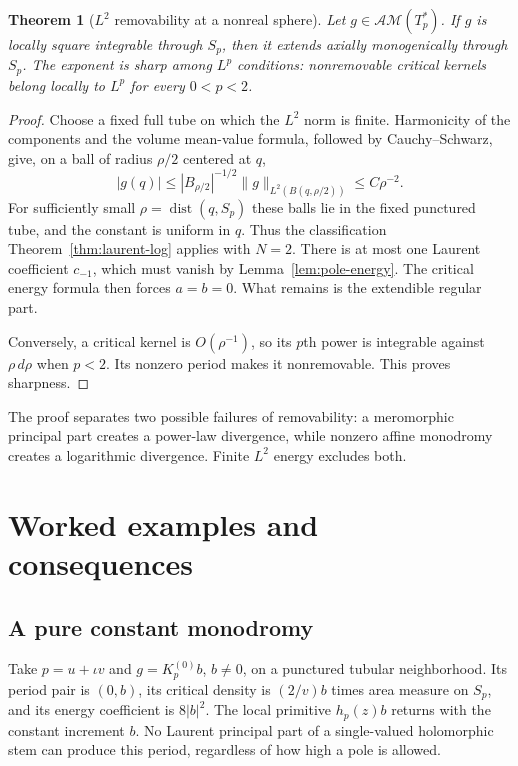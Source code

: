 \documentclass[11pt,a4paper]{article}
\numberwithin{equation}{section}
\newtheorem{theorem}{Theorem}[section]
\theoremstyle{definition}
\theoremstyle{remark}
\newcommand{\AM}{\mathcal{AM}}
\newcommand{\norm}[1]{\lVert #1\rVert}
\DeclareMathOperator{\dist}{dist}
\begin{document}
\begin{theorem}[$L^2$ removability at a nonreal sphere]\label{thm:L2}
Let $g\in\AM(T_p^*)$. If $g$ is locally square integrable through $S_p$, then
it extends axially monogenically through $S_p$. The exponent is sharp among
$L^p$ conditions: nonremovable critical kernels belong locally to $L^p$ for
every $0<p<2$.
\end{theorem}
\begin{proof}
Choose a fixed full tube on which the $L^2$ norm is finite. Harmonicity of the
components and the volume mean-value formula, followed by Cauchy--Schwarz,
give, on a ball of radius $\rho/2$ centered at $q$,
\[
 |g(q)|\leq |B_{\rho/2}|^{-1/2}\norm{g}_{L^2(B(q,\rho/2))}
       \leq C\rho^{-2}.
\]
For sufficiently small $\rho=\dist(q,S_p)$ these balls lie in the fixed
punctured tube, and the constant is uniform in $q$. Thus the classification
Theorem~\ref{thm:laurent-log} applies with $N=2$. There is at most one Laurent
coefficient $c_{-1}$, which must vanish by Lemma~\ref{lem:pole-energy}.
The critical energy formula then forces $a=b=0$. What remains is the
extendible regular part.

Conversely, a critical kernel is $O(\rho^{-1})$, so its $p$th power is
integrable against $\rho\,d\rho$ when $p<2$. Its nonzero period makes it
nonremovable. This proves sharpness.
\end{proof}

The proof separates two possible failures of removability: a meromorphic
principal part creates a power-law divergence, while nonzero affine monodromy
creates a logarithmic divergence. Finite $L^2$ energy excludes both.

\section{Worked examples and consequences}
\label{sec:examples}

\subsection{A pure constant monodromy}
Take $p=u+\iota v$ and $g=K_p^{(0)}b$, $b\ne0$, on a punctured tubular
neighborhood. Its period pair is $(0,b)$, its critical density is
$(2/v)b$ times area measure on $S_p$, and its energy coefficient is $8|b|^2$.
The local primitive $h_p(z)b$ returns with the constant increment $b$.
No Laurent principal part of a single-valued holomorphic stem can produce this
period, regardless of how high a pole is allowed.
\end{document}
